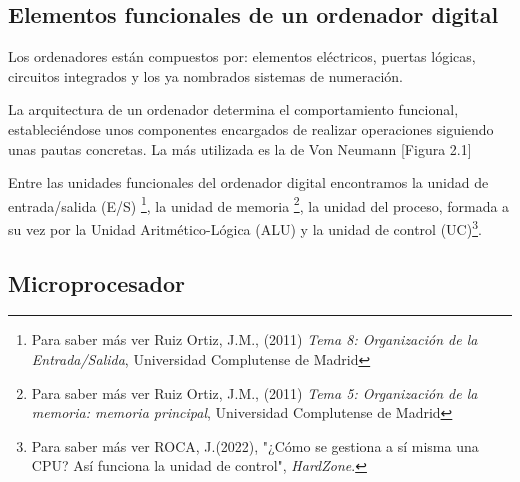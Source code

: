 \documentclass{book}
\begin{document}
\subsection {\textbf {Elementos funcionales de un ordenador digital}}

\begin{large}

Los ordenadores están compuestos por: elementos eléctricos, puertas lógicas, circuitos integrados y los ya nombrados sistemas de numeración.

La arquitectura de un ordenador determina el comportamiento funcional, estableciéndose unos componentes encargados de realizar operaciones siguiendo unas pautas concretas. La más utilizada es la de Von Neumann [Figura 2.1]

Entre las unidades funcionales del ordenador digital encontramos la unidad de entrada/salida (E/S) \footnote {\normalsize Para saber más ver Ruiz Ortiz, J.M., (2011) \textit{Tema 8: Organización de la Entrada/Salida}, Universidad Complutense de Madrid}, la unidad de memoria \footnote {\normalsize Para saber más ver Ruiz Ortiz, J.M., (2011) \textit{Tema 5: Organización de la memoria: memoria principal}, Universidad Complutense de Madrid}, la unidad del proceso, formada a su vez por la Unidad Aritmético-Lógica (ALU) y la unidad de control (UC)\footnote {\normalsize Para saber más ver ROCA, J.(2022), "¿Cómo se gestiona a sí misma una CPU? Así funciona la unidad de control", \textit{HardZone}.}. 

\end{large}

\subsection {\textbf {Microprocesador}}
\end{document}
